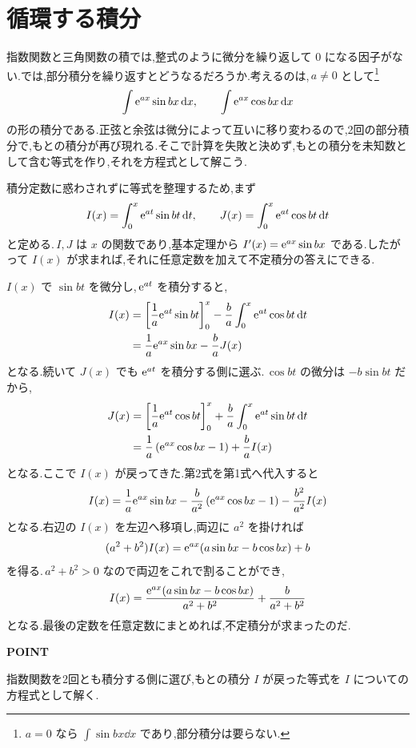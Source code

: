 \section{循環する積分}\label{節:部分積分の循環}

指数関数と三角関数の積では,整式のように微分を繰り返して $0$ になる因子がない.では,部分積分を繰り返すとどうなるだろうか.考えるのは,\,$a\neq0$ として\footnote{$a=0$ なら $\int\sin bx\dd x$ であり,部分積分は要らない.}
\[
 \int\mathrm{e}^{ax}\sin bx\,\mathrm{d} x,\qquad
 \int\mathrm{e}^{ax}\cos bx\,\mathrm{d} x
\]
の形の積分である.正弦と余弦は微分によって互いに移り変わるので,2回の部分積分で,もとの積分が再び現れる.そこで計算を失敗と決めず,もとの積分を未知数として含む等式を作り,それを方程式として解こう.

積分定数に惑わされずに等式を整理するため,まず
\[
 I(x)=\int_0^x\mathrm{e}^{at}\sin bt\,\mathrm{d} t,\qquad
 J(x)=\int_0^x\mathrm{e}^{at}\cos bt\,\mathrm{d} t
\]
と定める.\,$I,J$ は $x$ の関数であり,基本定理から $I'(x)=\mathrm{e}^{ax}\sin bx$ である.したがって $I(x)$ が求まれば,それに任意定数を加えて不定積分の答えにできる.

$I(x)$ で $\sin bt$ を微分し,\,$\mathrm{e}^{at}$ を積分すると,
\[
\begin{aligned}
 I(x)
 &=\left[\frac1a\mathrm{e}^{at}\sin bt\right]_0^x-\frac ba\int_0^x\mathrm{e}^{at}\cos bt\,\mathrm{d} t\\
 &=\frac1a\mathrm{e}^{ax}\sin bx-\frac baJ(x)
\end{aligned}
\]
となる.続いて $J(x)$ でも $\mathrm{e}^{at}$ を積分する側に選ぶ.\,$\cos bt$ の微分は $-b\sin bt$ だから,
\[
\begin{aligned}
 J(x)
 &=\left[\frac1a\mathrm{e}^{at}\cos bt\right]_0^x+\frac ba\int_0^x\mathrm{e}^{at}\sin bt\,\mathrm{d} t\\
 &=\frac1a\left(\mathrm{e}^{ax}\cos bx-1\right)+\frac baI(x)
\end{aligned}
\]
となる.ここで $I(x)$ が戻ってきた.第2式を第1式へ代入すると
\[
 I(x)
 =\frac1a\mathrm{e}^{ax}\sin bx-\frac b{a^2}\left(\mathrm{e}^{ax}\cos bx-1\right)-\frac{b^2}{a^2}I(x)
\]
となる.右辺の $I(x)$ を左辺へ移項し,両辺に $a^2$ を掛ければ
\[
 (a^2+b^2)I(x)=\mathrm{e}^{ax}(a\sin bx-b\cos bx)+b
\]
を得る.\,$a^2+b^2>0$ なので両辺をこれで割ることができ,
\[
 I(x)=\frac{\mathrm{e}^{ax}(a\sin bx-b\cos bx)}{a^2+b^2}+\frac{b}{a^2+b^2}
\]
となる.最後の定数を任意定数にまとめれば,不定積分が求まったのだ.

\begin{bookpoint}
\textbf{POINT}\par
指数関数を2回とも積分する側に選び,もとの積分 $I$ が戻った等式を $I$ についての方程式として解く.
\end{bookpoint}

